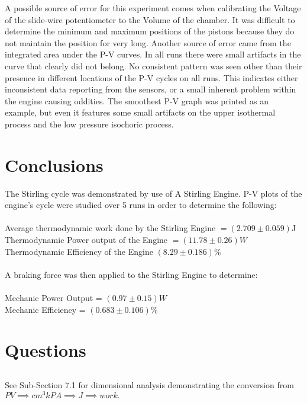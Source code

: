 \documentclass{article}
\begin{document}
A possible source of error for this experiment comes when calibrating the Voltage of the slide-wire potentiometer to the Volume of the chamber. It was difficult to determine the minimum and maximum positions of the pistons because they do not maintain the position for very long. Another source of error came from the integrated area under the P-V curves. In all runs there were small artifacts in the curve that clearly did not belong. No consistent pattern was seen other than their presence in different locations of the P-V cycles on all runs. This indicates either inconsistent data reporting from the sensors, or a small inherent problem within the engine causing oddities. The smoothest P-V graph was printed as an example, but even it features some small artifacts on the upper isothermal process and the low pressure isochoric process.
\section{Conclusions}
The Stirling cycle was demonstrated by use of A Stirling Engine. P-V plots of the engine's cycle were studied over 5 runs in order to determine the following:\\\\
Average thermodynamic work done by the Stirling Engine $=(2.709\pm0.059)$J\\
Thermodynamic Power output of the Engine $=(11.78\pm0.26)W$\\
Thermodynamic Efficiency of the Engine $(8.29\pm0.186)\%$\\\\
A braking force was then applied to the Stirling Engine to determine:\\\\
Mechanic Power Output = $(0.97\pm0.15)W$\\
Mechanic Efficiency = $(0.683\pm0.106)\%$


\section{Questions}
\subsection{}
See Sub-Section 7.1 for dimensional analysis demonstrating the conversion from $PV \implies cm^3kPA \implies J \implies work.$\\\\\\
\end{document}
